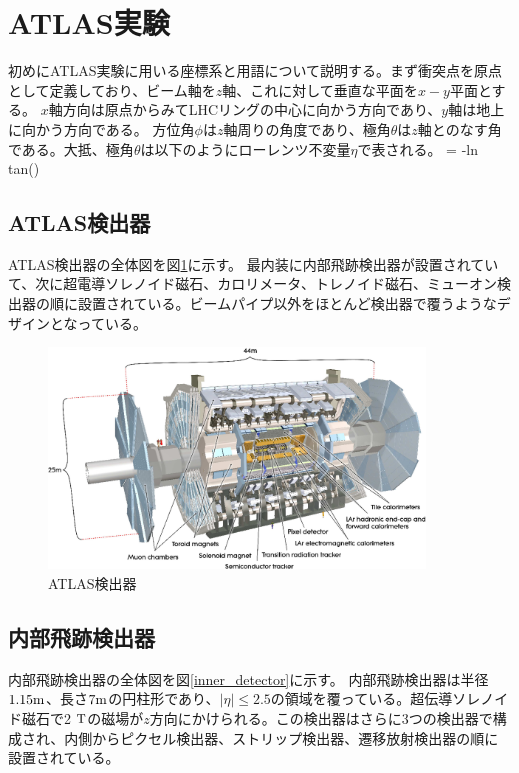 \section{ATLAS実験}
初めにATLAS実験に用いる座標系と用語について説明する。まず衝突点を原点として定義しており、ビーム軸を$z$軸、これに対して垂直な平面を$x-y$平面とする。
$x$軸方向は原点からみてLHCリングの中心に向かう方向であり、$y$軸は地上に向かう方向である。
方位角$\phi$は$z$軸周りの角度であり、極角$\theta$は$z$軸とのなす角である。大抵、極角$\theta$は以下のようにローレンツ不変量$\eta$で表される。
\bbb
\eta = -\rm{ln tan\left(\right)}
\eee


\subsection{ATLAS検出器}
ATLAS検出器の全体図を図\ref{atlas_detector}に示す。
最内装に内部飛跡検出器が設置されていて、次に超電導ソレノイド磁石、カロリメータ、トレノイド磁石、ミューオン検出器の順に設置されている。ビームパイプ以外をほとんど検出器で覆うようなデザインとなっている。

\begin{figure}[bpt]\centering
\includegraphics[width=10cm]{atlas_detector}
\caption[ATLAS検出器]{ATLAS検出器\cite{1-2}}
\label{atlas_detector}
\end{figure}


\subsection{内部飛跡検出器}
内部飛跡検出器の全体図を図\ref{inner_detector}に示す。
内部飛跡検出器は半径$1.15 \rm{m}$、長さ$7 \rm{m}$の円柱形であり、$|\eta|\leq 2.5$の領域を覆っている。超伝導ソレノイド磁石で2 $\rm{T}$の磁場が$z$方向にかけられる。この検出器はさらに3つの検出器で構成され、内側からピクセル検出器、ストリップ検出器、遷移放射検出器の順に設置されている。

